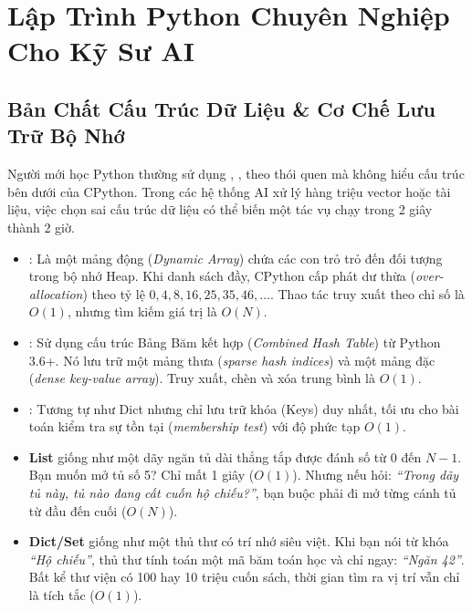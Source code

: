 
\chapter{Lập Trình Python Chuyên Nghiệp Cho Kỹ Sư AI}
\label{ch:phase1-python}

\section{Bản Chất Cấu Trúc Dữ Liệu \& Cơ Chế Lưu Trữ Bộ Nhớ}
\label{sec:py-data-structures}

Người mới học Python thường sử dụng , ,  theo thói quen mà không hiểu cấu trúc bên dưới của CPython. Trong các hệ thống AI xử lý hàng triệu vector hoặc tài liệu, việc chọn sai cấu trúc dữ liệu có thể biến một tác vụ chạy trong 2 giây thành 2 giờ.

\begin{definitionbox}
\begin{itemize}
  \item {}: Là một mảng động (\textit{Dynamic Array}) chứa các con trỏ trỏ đến đối tượng trong bộ nhớ Heap. Khi danh sách đầy, CPython cấp phát dư thừa (\textit{over-allocation}) theo tỷ lệ $0, 4, 8, 16, 25, 35, 46, \dots$. Thao tác truy xuất theo chỉ số là $O(1)$, nhưng tìm kiếm giá trị là $O(N)$.
  \item {}: Sử dụng cấu trúc Bảng Băm kết hợp (\textit{Combined Hash Table}) từ Python 3.6+. Nó lưu trữ một mảng thưa (\textit{sparse hash indices}) và một mảng đặc (\textit{dense key-value array}). Truy xuất, chèn và xóa trung bình là $O(1)$.
  \item {}: Tương tự như Dict nhưng chỉ lưu trữ khóa (Keys) duy nhất, tối ưu cho bài toán kiểm tra sự tồn tại (\textit{membership test}) với độ phức tạp $O(1)$.
\end{itemize}
\end{definitionbox}

\begin{intuitionbox}
\begin{itemize}
  \item \textbf{List} giống như một dãy ngăn tủ dài thẳng tắp được đánh số từ $0$ đến $N-1$. Bạn muốn mở tủ số 5? Chỉ mất 1 giây ($O(1)$). Nhưng nếu hỏi: \textit{``Trong dãy tủ này, tủ nào đang cất cuốn hộ chiếu?''}, bạn buộc phải đi mở từng cánh tủ từ đầu đến cuối ($O(N)$).
  \item \textbf{Dict/Set} giống như một thủ thư có trí nhớ siêu việt. Khi bạn nói từ khóa \textit{``Hộ chiếu''}, thủ thư tính toán một mã băm toán học và chỉ ngay: \textit{``Ngăn 42''}. Bất kể thư viện có 100 hay 10 triệu cuốn sách, thời gian tìm ra vị trí vẫn chỉ là tích tắc ($O(1)$).
\end{itemize}
\end{intuitionbox}

